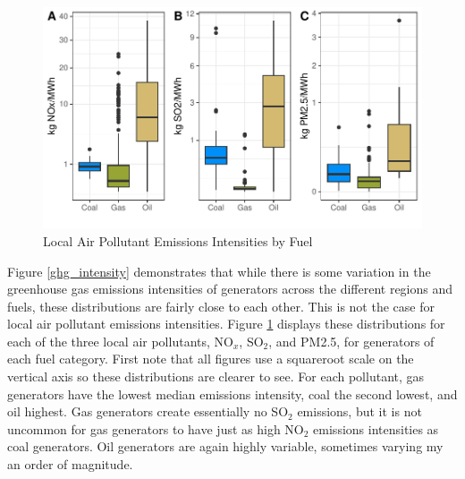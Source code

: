 \begin{figure}
    \centering
    \caption{Local Air Pollutant Emissions Intensities by Fuel\label{pol_intensities}}
    \includegraphics[width=\textwidth]{figures/chapter5_figures/local_poll_EI.pdf}
\end{figure}

Figure \ref{ghg_intensity} demonstrates that while there is some variation in the greenhouse gas emissions intensities of generators across the different regions and fuels, these distributions are fairly close to each other. This is not the case for local air pollutant emissions intensities. Figure \ref{pol_intensities} displays these distributions for each of the three local air pollutants, NO$_x$, SO$_2$, and PM2.5, for generators of each fuel category. First note that all figures use a squareroot scale on the vertical axis so these distributions are clearer to see. For each pollutant, gas generators have the lowest median emissions intensity, coal the second lowest, and oil highest. Gas generators create essentially no SO$_2$ emissions, but it is not uncommon for gas generators to have just as high NO$_2$ emissions intensities as coal generators. Oil generators are again highly variable, sometimes varying my an order of magnitude. 

